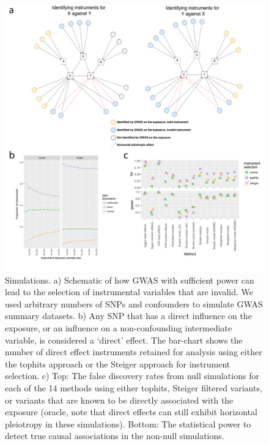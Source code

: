 \documentclass[]{article}
\begin{document}
\begin{figure}
\centering
\includegraphics{images/fig1.pdf}
\caption{Simulations. a) Schematic of how GWAS with sufficient power can
lead to the selection of instrumental variables that are invalid. We
used arbitrary numbers of SNPs and confounders to simulate GWAS summary
datasets. b) Any SNP that has a direct influence on the exposure, or an
influence on a non-confounding intermediate variable, is considered a
`direct' effect. The bar-chart shows the number of direct effect
instruments retained for analysis using either the tophits approach or
the Steiger approach for instrument selection. c) Top: The false
discovery rates from null simulations for each of the 14 methods using
either tophits, Steiger filtered variants, or variants that are known to
be directly associated with the exposure (oracle, note that direct
effects can still exhibit horizontal pleiotropy in these simulations).
Bottom: The statistical power to detect true causal associations in the
non-null simulations.}
\end{figure}

\newpage
\end{document}
